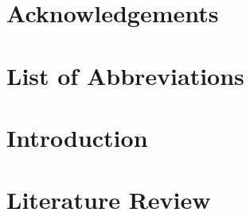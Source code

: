 \documentclass[12pt,a4paper,oneside]{book}
\begin{document}
\chapter*{Acknowledgements}


\chapter*{List of Abbreviations}

\tableofcontents
\listoffigures
\listoftables

\mainmatter
{}

\chapter{Introduction}
\label{ch:intro}

\chapter{Literature Review}
\label{ch:related}
\end{document}
